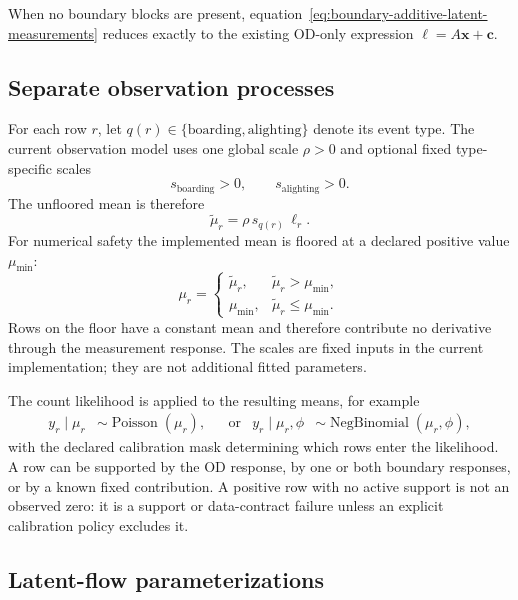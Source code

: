 When no boundary blocks are present, equation~\eqref{eq:boundary-additive-latent-measurements}
reduces exactly to the existing OD-only expression
$\bm\ell=A\bm x+\bm c$.

\subsection{Separate observation processes}

For each row $r$, let $q(r)\in\{\mathrm{boarding},\mathrm{alighting}\}$
denote its event type.  The current observation model uses one global scale
$\rho>0$ and optional fixed type-specific scales
\[
 s_{\mathrm{boarding}}>0,\qquad
 s_{\mathrm{alighting}}>0.
\]
The unfloored mean is therefore
\begin{equation}
  \widetilde\mu_r
   =\rho\,s_{q(r)}\,\ell_r.
  \label{eq:boundary-observation-mean}
\end{equation}
For numerical safety the implemented mean is floored at a declared positive
value $\mu_{\min}$:
\[
 \mu_r=\begin{cases}
   \widetilde\mu_r,&\widetilde\mu_r>\mu_{\min},\\
   \mu_{\min},&\widetilde\mu_r\leq\mu_{\min}.
 \end{cases}
\]
Rows on the floor have a constant mean and therefore contribute no derivative
through the measurement response.  The scales are fixed inputs in the
current implementation; they are not additional fitted parameters.

The count likelihood is applied to the resulting means, for example
\begin{align}
  y_r\mid\mu_r &\sim \operatorname{Poisson}(\mu_r),
  &&\text{or} &
  y_r\mid\mu_r,\phi &\sim
       \operatorname{NegBinomial}(\mu_r,\phi),
\end{align}
with the declared calibration mask determining which rows enter the
likelihood.  A row can be supported by the OD response, by one or both
boundary responses, or by a known fixed contribution.  A positive row with no
active support is not an observed zero: it is a support or data-contract
failure unless an explicit calibration policy excludes it.

\subsection{Latent-flow parameterizations}

